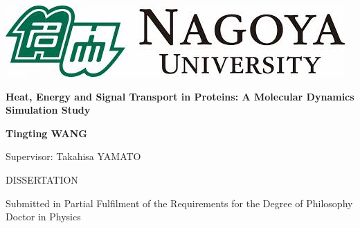 \documentclass[12pt, oneside]{article}
\begin{document}
\graphicspath{ {figures/titlepage/} }
 
\thispagestyle{empty}
\begin{center}
\begin{minipage}{1\linewidth}
    \centering
    \includegraphics[width=0.6\linewidth]{images.jpeg}\par
    \vspace{1cm}
    {{\Huge \textbf {Heat, Energy and Signal Transport in Proteins: 
    A Molecular Dynamics Simulation Study}\par}}
    \vspace{2cm}
    {\Large \textbf {Tingting WANG}\par}
    \vspace{1cm}
    {\Large Supervisor: Takahisa YAMATO \par}
    \vspace{1.5cm}
    {\Large DISSERTATION \par
    Submitted in Partial Fulfilment of the Requirements 
    for the Degree of 
    Philosophy Doctor in Physics\par}
    \vspace{1.5cm}
    {\Large  \linespread{1.5}{
    Computational Biophysics Laboratory (B-Lab) \par
    Graduate School of Science \par
    September 2023 \par}}
\end{minipage}
\end{center}
\clearpage
 
\end{document}
